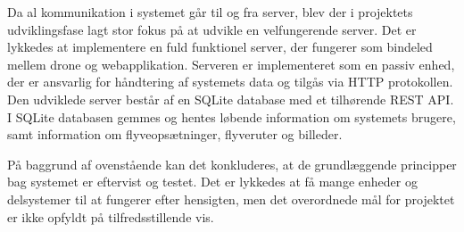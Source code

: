 Da al kommunikation i systemet går til og fra server, blev der i projektets udviklingsfase lagt stor fokus på at udvikle en velfungerende server. Det er lykkedes at implementere en fuld funktionel server, der fungerer som bindeled mellem drone og webapplikation. Serveren er implementeret som en passiv enhed, der er ansvarlig for håndtering af systemets data og tilgås via HTTP protokollen. Den udviklede server består af en SQLite database med et tilhørende REST API. I SQLite databasen gemmes og hentes løbende information om systemets brugere, samt information om flyveopsætninger, flyveruter og billeder. 


På baggrund af ovenstående kan det konkluderes, at de grundlæggende principper bag systemet er eftervist og testet. Det er lykkedes at få  mange enheder og delsystemer til at fungerer efter hensigten, men det overordnede mål for projektet er ikke opfyldt på tilfredsstillende vis.